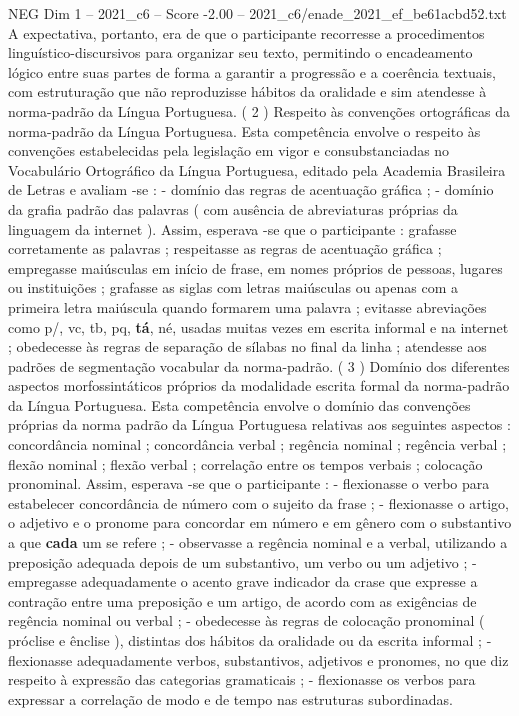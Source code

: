 \begin{textsample}{NEG Dim 1 – 2021\_c6 – Score -2.00 – 2021\_c6/enade\_2021\_ef\_be61acbd52.txt}
A expectativa, portanto, era de que o participante recorresse a procedimentos linguístico-discursivos para organizar seu texto, permitindo o encadeamento lógico entre suas partes de forma a garantir a progressão e a coerência textuais, com estruturação que não reproduzisse hábitos da oralidade e sim atendesse à norma-padrão da Língua Portuguesa. ( 2 ) Respeito às convenções ortográficas da norma-padrão da Língua Portuguesa.
Esta competência envolve o respeito às convenções estabelecidas pela legislação em vigor e consubstanciadas no Vocabulário Ortográfico da Língua Portuguesa, editado pela Academia Brasileira de Letras e avaliam -se : - domínio das regras de acentuação gráfica ; - domínio da grafia padrão das palavras ( com ausência de abreviaturas próprias da linguagem da internet ).
Assim, esperava -se que o participante : grafasse corretamente as palavras ; respeitasse as regras de acentuação gráfica ; empregasse maiúsculas em início de frase, em nomes próprios de pessoas, lugares ou instituições ; grafasse as siglas com letras maiúsculas ou apenas com a primeira letra maiúscula quando formarem uma palavra ; evitasse abreviações como p/, vc, tb, pq, \textbf{tá}, né, usadas muitas vezes em escrita informal e na internet ; obedecesse às regras de separação de sílabas no final da linha ; atendesse aos padrões de segmentação vocabular da norma-padrão. ( 3 ) Domínio dos diferentes aspectos morfossintáticos próprios da modalidade escrita formal da norma-padrão da Língua Portuguesa.
Esta competência envolve o domínio das convenções próprias da norma padrão da Língua Portuguesa relativas aos seguintes aspectos : concordância nominal ; concordância verbal ; regência nominal ; regência verbal ; flexão nominal ; flexão verbal ; correlação entre os tempos verbais ; colocação pronominal.
Assim, esperava -se que o participante : - flexionasse o verbo para estabelecer concordância de número com o sujeito da frase ; - flexionasse o artigo, o adjetivo e o pronome para concordar em número e em gênero com o substantivo a que \textbf{cada} um se refere ; - observasse a regência nominal e a verbal, utilizando a preposição adequada depois de um substantivo, um verbo ou um adjetivo ; - empregasse adequadamente o acento grave indicador da crase que expresse a contração entre uma preposição e um artigo, de acordo com as exigências de regência nominal ou verbal ; - obedecesse às regras de colocação pronominal ( próclise e ênclise ), distintas dos hábitos da oralidade ou da escrita informal ; - flexionasse adequadamente verbos, substantivos, adjetivos e pronomes, no que diz respeito à expressão das categorias gramaticais ; - flexionasse os verbos para expressar a correlação de modo e de tempo nas estruturas subordinadas.

\end{textsample}
